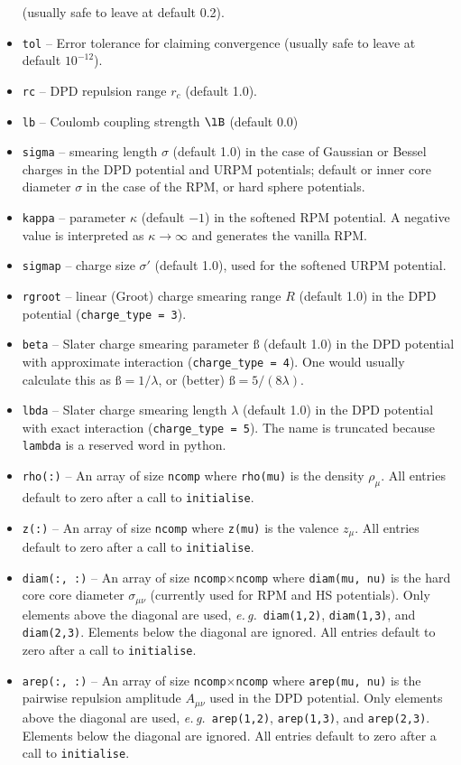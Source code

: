\documentclass[12pt,a4paper]{article}
\newcommand{\latin}[1]{\emph{#1}}
\newcommand{\eg}{\latin{e.\,g.}}
\newcommand{\varbeta}{\text{\ss}}
\begin{document}
\begin{itemize}
  (usually safe to leave at default 0.2).
%
\item\verb+tol+ -- Error tolerance for claiming convergence (usually
  safe to leave at default $10^{-12}$).
%
\item\verb+rc+ -- DPD repulsion range $r_c$ (default 1.0).
%
\item\verb+lb+ -- Coulomb coupling strength $\lB$ (default 0.0)
%
\item\verb+sigma+ -- smearing length $\sigma$ (default 1.0) in the
  case of Gaussian or Bessel charges in the DPD potential and URPM
  potentials; default or inner core diameter $\sigma$ in the case of
  the RPM, or hard sphere potentials.
%
\item\verb+kappa+ -- parameter $\kappa$ (default $-1$) in the
  softened RPM potential.  A negative value is interpreted as
  $\kappa\to\infty$ and generates the vanilla RPM.
%
\item\verb+sigmap+ -- charge size $\sigma'$ (default 1.0), used for
  the softened URPM potential.
%
\item\verb+rgroot+ -- linear (Groot) charge smearing range $R$
  (default 1.0) in the DPD potential (\verb+charge_type = 3+).
%
\item\verb+beta+ -- Slater charge smearing parameter $\varbeta$
  (default 1.0) in the DPD potential with approximate interaction
  (\verb+charge_type = 4+).  One would usually calculate this as
  $\varbeta=1/\lambda$, or (better) $\varbeta=5/(8\lambda)$.
%
\item\verb+lbda+ -- Slater charge smearing length $\lambda$ (default
  1.0) in the DPD potential with exact interaction
  (\verb+charge_type = 5+).  The name is truncated because
  \verb+lambda+ is a reserved word in python.
%
\item\verb+rho(:)+ -- An array of size \verb+ncomp+ where
  \verb+rho(mu)+ is the density $\rho_\mu$.  All entries default to
  zero after a call to \verb+initialise+.
%
\item\verb+z(:)+ -- An array of size \verb+ncomp+ where
  \verb+z(mu)+ is the valence $z_\mu$.  All entries default to
  zero after a call to \verb+initialise+.
%
\item\verb+diam(:, :)+ -- An array of size
  \verb+ncomp+$\times$\verb+ncomp+ where \verb+diam(mu, nu)+ is the
  hard core core diameter $\sigma_{\mu\nu}$ (currently used for RPM
  and HS potentials).  Only elements above the diagonal are used,
  \eg\ \verb+diam(1,2)+, \verb+diam(1,3)+, and \verb+diam(2,3)+.
  Elements below the diagonal are ignored.  All entries default to
  zero after a call to \verb+initialise+.
%
\item\verb+arep(:, :)+ -- An array of size
  \verb+ncomp+$\times$\verb+ncomp+ where \verb+arep(mu, nu)+ is the
  pairwise repulsion amplitude $A_{\mu\nu}$ used in the DPD potential.
  Only elements above the diagonal are used, \eg\ \verb+arep(1,2)+,
  \verb+arep(1,3)+, and \verb+arep(2,3)+.  Elements below the diagonal
  are ignored.  All entries default to zero after a call to
  \verb+initialise+.
%
\end{itemize}
\end{document}

